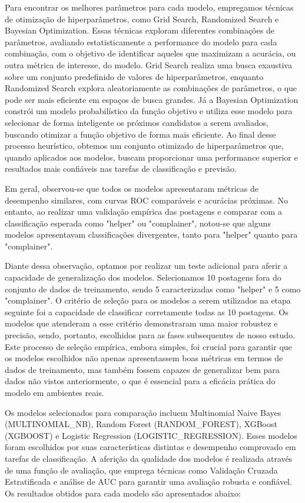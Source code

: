 Para encontrar os melhores parâmetros para cada modelo, empregamos técnicas de otimização de hiperparâmetros, como Grid Search, Randomized Search e Bayesian Optimization. Essas técnicas exploram diferentes combinações de parâmetros, avaliando estatisticamente a performance do modelo para cada combinação, com o objetivo de identificar aqueles que maximizam a acurácia, ou outra métrica de interesse, do modelo. Grid Search realiza uma busca exaustiva sobre um conjunto predefinido de valores de hiperparâmetros, enquanto Randomized Search explora aleatoriamente as combinações de parâmetros, o que pode ser mais eficiente em espaços de busca grandes. Já a Bayesian Optimization constrói um modelo probabilístico da função objetivo e utiliza esse modelo para selecionar de forma inteligente os próximos candidatos a serem avaliados, buscando otimizar a função objetivo de forma mais eficiente. Ao final desse processo heurístico, obtemos um conjunto otimizado de hiperparâmetros que, quando aplicados aos modelos, buscam proporcionar uma performance superior e resultados mais confiáveis nas tarefas de classificação e previsão.

Em geral, observou-se que todos os modelos apresentaram métricas de desempenho similares, com curvas ROC comparáveis e acurácias próximas. No entanto, ao realizar uma validação empírica das postagens e comparar com a classificação esperada como "helper" ou "complainer", notou-se que alguns modelos apresentavam classificações divergentes, tanto para "helper" quanto para "complainer".

Diante dessa observação, optamos por realizar um teste adicional para aferir a capacidade de generalização dos modelos. Selecionamos 10 postagens fora do conjunto de dados de treinamento, sendo 5 caracterizadas como "helper" e 5 como "complainer". O critério de seleção para os modelos a serem utilizados na etapa seguinte foi a capacidade de classificar corretamente todas as 10 postagens. Os modelos que atenderam a esse critério demonstraram uma maior robustez e precisão, sendo, portanto, escolhidos para as fases subsequentes de nosso estudo. Este processo de seleção empírica, embora simples, foi crucial para garantir que os modelos escolhidos não apenas apresentassem boas métricas em termos de dados de treinamento, mas também fossem capazes de generalizar bem para dados não vistos anteriormente, o que é essencial para a eficácia prática do modelo em ambientes reais.

Os modelos selecionados para comparação incluem Multinomial Naive Bayes (MULTINOMIAL\_NB), Random Forest (RANDOM\_FOREST), XGBoost (XGBOOST) e Logistic Regression (LOGISTIC\_REGRESSION). Esses modelos foram escolhidos por suas características distintas e desempenho comprovado em tarefas de classificação. A aferição da qualidade dos modelos é realizada através de uma função de avaliação, que emprega técnicas como Validação Cruzada Estratificada e análise de AUC para garantir uma avaliação robusta e confiável. Os resultados obtidos para cada modelo são apresentados abaixo:

